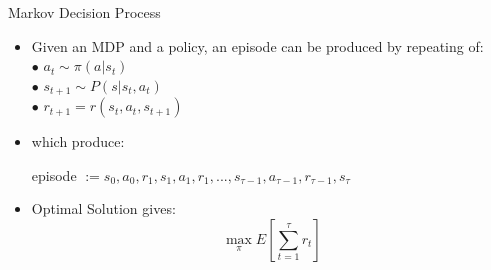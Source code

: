 \begin{frame}{Markov Decision Process}
    \begin{itemize}
        \item Given an MDP and a policy, an episode can be produced by repeating of:\\

        \hspace{0.5cm}$\bullet$  $a_{t} ∼ \pi(a|s_{t})$\\
        \hspace{0.5cm}$\bullet$  $s_{t+1} ∼P(s|s_{t},a_{t})$ \\
        \hspace{0.5cm}$\bullet$  $r_{t+1} =r(s_{t},a_{t},s_{t+1})$ \\  
        \item which produce:\\
            \begin{center}
                episode $:= s_{0},a_{0},r_{1},s_{1},a_{1},r_{1},...,s_{\tau−1},a_{\tau−1},r_{\tau−1},s_{\tau}$
            \end{center}
        \bigskip
        \item Optimal Solution gives: \\
            \begin{equation}
                \max\limits_{\pi} E [\sum_{t=1}^{\tau} r_{t}]
            \end{equation}
        
    \end{itemize}
\end{frame}


